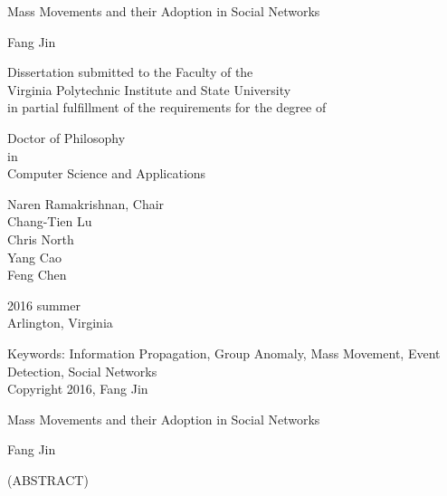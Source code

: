 \documentclass[12pt,dvips]{report}
\begin{document}
\thispagestyle{empty}
\begin{center}

{\Large
Mass Movements and their Adoption in Social Networks
}


\vfill

Fang Jin

\vfill

Dissertation submitted to the Faculty of the \\
Virginia Polytechnic Institute and State University \\
in partial fulfillment of the requirements for the degree of

\vfill

Doctor of Philosophy \\
in \\
Computer Science and Applications

\vfill

Naren Ramakrishnan, Chair \\
Chang-Tien Lu \\
Chris North \\
Yang Cao \\
Feng Chen

\vfill

2016 summer \\
Arlington, Virginia

\vfill

Keywords: Information Propagation, Group Anomaly, Mass Movement, Event Detection, Social Networks
\\
Copyright 2016, Fang Jin

\end{center}

\pagebreak

\thispagestyle{empty}
\begin{center}

{\large
Mass Movements and their Adoption in Social Networks
}

\vfill

Fang Jin

\vfill

(ABSTRACT)
\vfill

\end{center}
\end{document}
